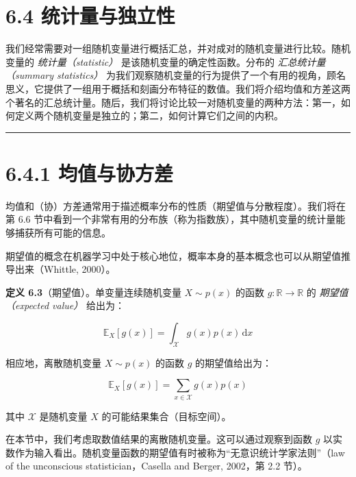 \section*{6.4 统计量与独立性}
\label{sec:6.4}

我们经常需要对一组随机变量进行概括汇总，并对成对的随机变量进行比较。随机变量的 \emph{统计量（statistic）} 是该随机变量的确定性函数。分布的 \emph{汇总统计量（summary statistics）} 为我们观察随机变量的行为提供了一个有用的视角，顾名思义，它提供了一组用于概括和刻画分布特征的数值。我们将介绍均值和方差这两个著名的汇总统计量。随后，我们将讨论比较一对随机变量的两种方法：第一，如何定义两个随机变量是独立的；第二，如何计算它们之间的内积。

\medskip\hrule\medskip

\section*{6.4.1 均值与协方差}

均值和（协）方差通常用于描述概率分布的性质（期望值与分散程度）。我们将在第 6.6 节中看到一个非常有用的分布族（称为指数族），其中随机变量的统计量能够捕获所有可能的信息。

期望值的概念在机器学习中处于核心地位，概率本身的基本概念也可以从期望值推导出来（Whittle, 2000）。

\textbf{定义 6.3}（期望值）。单变量连续随机变量 $ X \sim p(x) $ 的函数 $ g : \mathbb{R} \to \mathbb{R} $ 的 \emph{期望值（expected value）} 给出为：

\begin{equation}
\mathbb{E}_X[g(x)] = \int_{\mathcal{X}} g(x)p(x)\,\mathrm{d}x
\tag{6.28}\label{eq:6-28}
\end{equation}

相应地，离散随机变量 $ X \sim p(x) $ 的函数 $ g $ 的期望值给出为：

\begin{equation}
\mathbb{E}_X[g(x)] = \sum_{x \in \mathcal{X}} g(x)p(x)
\tag{6.29}\label{eq:6-29}
\end{equation}

其中 $ \mathcal{X} $ 是随机变量 $ X $ 的可能结果集合（目标空间）。

在本节中，我们考虑取数值结果的离散随机变量。这可以通过观察到函数 $ g $ 以实数作为输入看出。随机变量函数的期望值有时被称为“无意识统计学家法则”（law of the unconscious statistician，Casella and Berger, 2002，第 2.2 节）。

